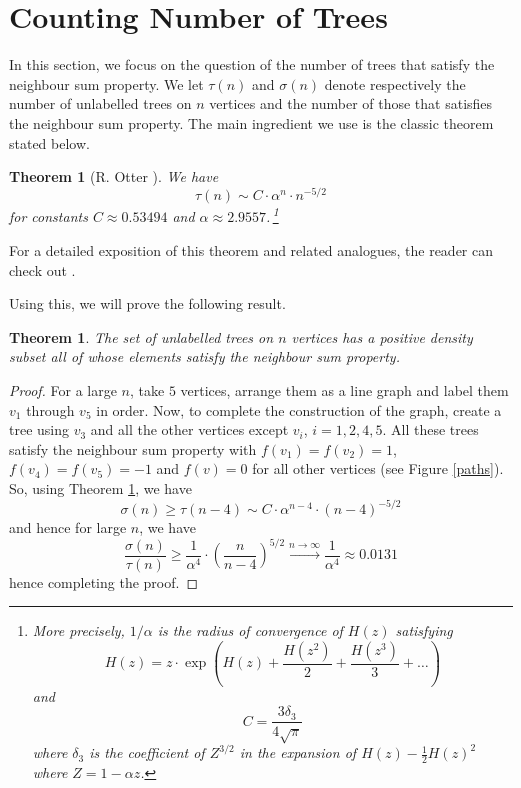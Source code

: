 \documentclass[11pt]{article}
\newtheorem{thm}[nummer]{Theorem}
\newtheorem{citedthm}{Theorem}
\begin{document}
\section{Counting Number of Trees}\label{count}
In this section, we focus on the question of the number of trees that satisfy the neighbour sum property. We let $\tau(n)$ and $\sigma(n)$ denote respectively the number of unlabelled trees on $n$ vertices and the number of those that satisfies the neighbour sum property. The main ingredient we use is the classic theorem stated below.
\begin{citedthm}[R. Otter \cite{otter}]\label{otter}
    We have
    $$\tau(n) \sim C \cdot \alpha^n \cdot n^{-5/2}$$
    for
    constants $C\approx 0.53494$ and $\alpha \approx 2.9557$.\,\footnote{More precisely, $1/\alpha$ is the radius of convergence of $H(z)$ satisfying
    $$H(z) = z\cdot \exp \left( H(z) + \frac{H(z^2)}{2} + \frac{H(z^3)}{3} + \dots \right)$$
    and
    $$C=\frac{3\delta_3}{4\sqrt \pi}$$
    where $\delta_3$ is the coefficient of $Z^{3/2}$ in the expansion of
    $H(z)-\frac 12 H(z)^2$ where $Z=1-\alpha z$.
    } 
\end{citedthm}

For a detailed exposition of this theorem and related analogues, the reader can check out \cite{analcomb}.

Using this, we will prove the following result.
\begin{thm}
    The set of unlabelled trees on $n$ vertices has a positive density subset all of whose elements satisfy the neighbour sum property.
\end{thm}
\begin{proof}
    For a large $n$, take $5$ vertices, arrange them as a line graph and label them $v_1$ through $v_5$ in order. Now, to complete the construction of the graph, create a tree using $v_3$ and all the other vertices except $v_i$, $i=1,2,4,5$. All these trees satisfy the neighbour sum property with $f(v_1)=f(v_2)=1$, $f(v_4)=f(v_5)=-1$ and $f(v)=0$ for all other vertices (see Figure \ref{paths}). So, using Theorem \ref{otter}, we have
    $$\sigma(n)\ge \tau(n-4) \sim C\cdot \alpha^{n-4} \cdot (n-4)^{-5/2}$$
    and hence for large $n$, we have
    $$\frac{\sigma(n)}{\tau(n)}\ge \frac 1{\alpha^4} \cdot \left(\frac{n}{n-4}\right)^{5/2} \xrightarrow[]{n\to \infty} \frac 1{\alpha^4}\approx 0.0131$$
    hence completing the proof.
\end{proof}
\end{document}
